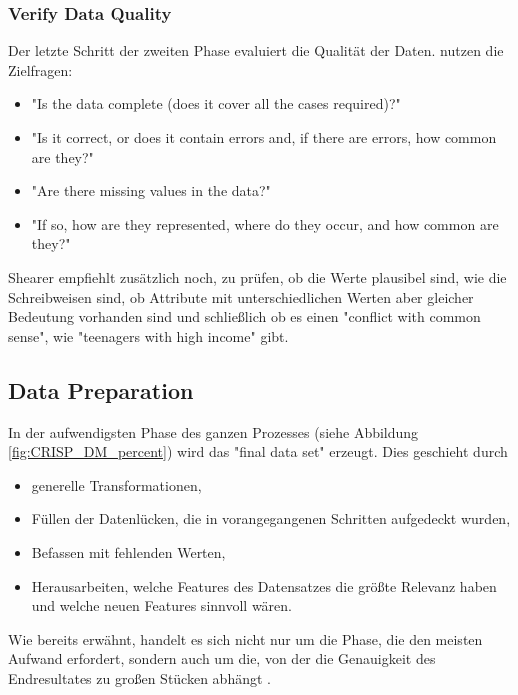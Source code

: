 \subsubsection{Verify Data Quality}
Der letzte Schritt der zweiten Phase evaluiert die Qualität der Daten. \citep[S.19]{chapman_crisp-dm_2000} nutzen die Zielfragen: 
\begin{itemize}
\item "Is the data complete (does it cover all the cases required)?"
\item "Is it correct, or does it contain errors and, if there are errors, how common are they?"
\item "Are there missing values in the data?"
\item "If so, how are they represented, where do they occur, and how common
are they?"
\end{itemize}
Shearer empfiehlt zusätzlich noch, zu prüfen, ob die Werte plausibel sind, wie die Schreibweisen sind, ob Attribute mit unterschiedlichen Werten aber gleicher Bedeutung vorhanden sind \citep[S.~16]{shearer_crisp-dm_2000} und schließlich ob es einen "conflict with common sense", wie "teenagers with high income" \citep[S.~16]{shearer_crisp-dm_2000} gibt. 
\subsection{Data Preparation}\label{subsubsec:DataPreperation}
In der aufwendigsten Phase des ganzen Prozesses (siehe Abbildung \ref{fig:CRISP_DM_percent}) wird das "final data set"  erzeugt. Dies geschieht durch \citep[S.~73]{swamynathan_mastering_2017}
\begin{itemize}
\item generelle Transformationen,
\item Füllen der Datenlücken, die in vorangegangenen Schritten aufgedeckt wurden,
\item Befassen mit fehlenden Werten,
\item Herausarbeiten, welche Features des Datensatzes die größte Relevanz haben und welche neuen Features sinnvoll wären.
\end{itemize}
Wie bereits erwähnt, handelt es sich nicht nur um die Phase, die den meisten Aufwand erfordert, sondern auch um die, von der die Genauigkeit des Endresultates zu großen Stücken abhängt \citep[S.~73]{swamynathan_mastering_2017}.

